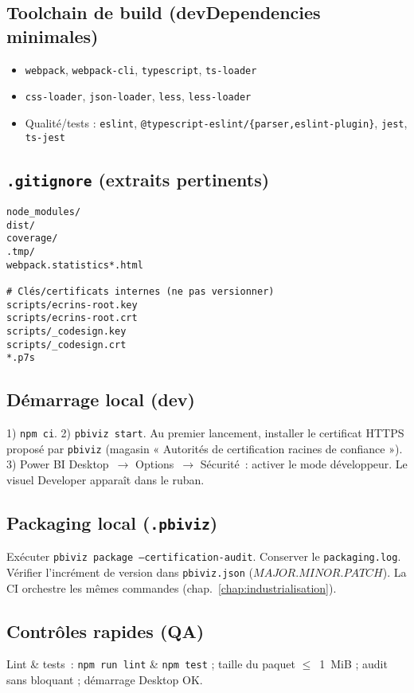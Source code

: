 \subsection{Toolchain de build (devDependencies minimales)}
\begin{itemize}
  \item \texttt{webpack}, \texttt{webpack-cli}, \texttt{typescript}, \texttt{ts-loader}
  \item \texttt{css-loader}, \texttt{json-loader}, \texttt{less}, \texttt{less-loader}
  \item Qualité/tests : \texttt{eslint}, \texttt{@typescript-eslint/\{parser,eslint-plugin\}}, \texttt{jest}, \texttt{ts-jest}
\end{itemize}

\subsection{\texttt{.gitignore} (extraits pertinents)}
\begin{lstlisting}[basicstyle=\ttfamily\small]
node_modules/
dist/
coverage/
.tmp/
webpack.statistics*.html

# Clés/certificats internes (ne pas versionner)
scripts/ecrins-root.key
scripts/ecrins-root.crt
scripts/_codesign.key
scripts/_codesign.crt
*.p7s
\end{lstlisting}

\subsection{Démarrage local (dev)}
1) \texttt{npm ci}. 2) \texttt{pbiviz start}. Au premier lancement, installer le certificat HTTPS proposé par \texttt{pbiviz} (magasin « Autorités de certification racines de confiance »). 3) Power BI Desktop~\(\rightarrow\) Options~\(\rightarrow\) Sécurité~: activer le mode développeur. Le visuel Developer apparaît dans le ruban.

\subsection{Packaging local (\texttt{.pbiviz})}
Exécuter \texttt{pbiviz package --certification-audit}. Conserver le \texttt{packaging.log}. Vérifier l’incrément de version dans \texttt{pbiviz.json} (\(MAJOR.MINOR.PATCH\)). La CI orchestre les mêmes commandes (chap.~\ref{chap:industrialisation}).

\subsection{Contrôles rapides (QA)}
Lint \& tests~: \texttt{npm run lint} \& \texttt{npm test} ; taille du paquet \(\leq\)~1~MiB ; audit sans bloquant ; démarrage Desktop OK.
